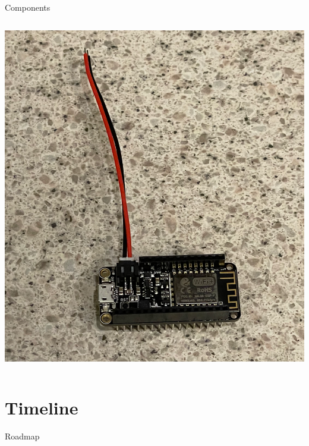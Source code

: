 \documentclass{beamer}
\begin{document}
\begin{frame}{\sectitle}{Components}
\begin{columns}
\begin{column}{.5\textwidth}
\begin{center}
          \includegraphics[scale=.1]{images/battery.png}
        \end{center}
      \end{column}
    \end{columns}
  \end{frame}


  \renewcommand{\sectitle}{Timeline}
  \section{\sectitle}
  \begin{frame}{Roadmap}
      \tableofcontents[currentsection]
  \end{frame}
\end{document}
